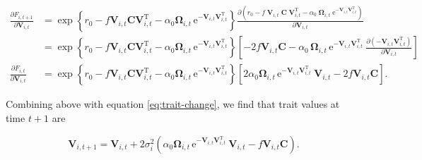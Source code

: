 \begin{equation*}
\begin{split}
    \frac{\partial F_{i,t+1}}{\partial \mathbf{V}_{i,t}} &=
        \exp \left\{
            r_0
            - f \mathbf{V}_{i,t} \mathbf{C} \mathbf{V}_{i,t}^{\textrm{T}}
            - \alpha_0  \mathbf{\Omega}_{i,t} \,
                \textrm{e}^{- \mathbf{V}_{i,t} \mathbf{V}_{i,t}^{\textrm{T}}}
        \right\}
        \frac{\partial \!
            \left(
                r_0
                - f \; \mathbf{V}_{i,t} \; \mathbf{C} \; \mathbf{V}_{i,t}^{\textrm{T}}
                - \alpha_0 \; \mathbf{\Omega}_{i,t} \;
                    \textrm{e}^{- \mathbf{V}_{i,t} \mathbf{V}_{i,t}^{\textrm{T}}}
            \right)
            }{ \partial \mathbf{V}_{i,t} } \\
     &=
        \exp \left\{
            r_0
            - f \mathbf{V}_{i,t} \mathbf{C} \mathbf{V}_{i,t}^{\textrm{T}}
            - \alpha_0  \mathbf{\Omega}_{i,t} \,
                \textrm{e}^{- \mathbf{V}_{i,t} \mathbf{V}_{i,t}^{\textrm{T}}}
        \right\}
        \left[
            - 2 f \mathbf{V}_{i,t} \mathbf{C}
            - \alpha_0 \, \mathbf{\Omega}_{i,t} \,
                \textrm{e}^{- \mathbf{V}_{i,t} \mathbf{V}_{i,t}^{\textrm{T}}} \:
                \frac{\partial \! \left( - \mathbf{V}_{i,t} \mathbf{V}_{i,t}^{\textrm{T}} \right)
                    }{ \partial \mathbf{V}_{i,t} }
        \right] \\[2ex]
    \frac{ \partial F_{i,t} }{ \partial \mathbf{V}_{i,t} } &=
        \exp \left\{
            r_0
            - f \mathbf{V}_{i,t} \mathbf{C} \mathbf{V}_{i,t}^{\textrm{T}}
            - \alpha_0  \mathbf{\Omega}_{i,t} \,
                \textrm{e}^{- \mathbf{V}_{i,t} \mathbf{V}_{i,t}^{\textrm{T}}}
        \right\}
        \left[
            2 \alpha_0 \mathbf{\Omega}_{i,t} \,
                \textrm{e}^{- \mathbf{V}_{i,t} \mathbf{V}_{i,t}^{\textrm{T}}} \:
                \mathbf{V}_{i,t}
            - 2 f \mathbf{V}_{i,t} \mathbf{C}
        \right]
    \textrm{.}
\end{split}
\end{equation*}



Combining above with equation \ref{eq:trait-change}, we find that trait values at
time $t+1$ are

\begin{equation} \label{eq:trait-change-full}
    \mathbf{V}_{i,t+1} = \mathbf{V}_{i,t} + 2 \sigma_i^2
    \left(
        \alpha_0 \mathbf{\Omega}_{i,t} \,
            \textrm{e}^{- \mathbf{V}_{i,t} \mathbf{V}_{i,t}^{\textrm{T}}} \:
            \mathbf{V}_{i,t}
        - f \mathbf{V}_{i,t} \mathbf{C}
    \right)
    \textrm{.}
\end{equation}


